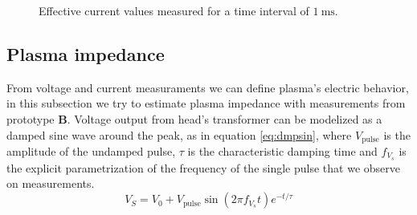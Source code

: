 \begin{figure}
 \centering
 \hfill
 \caption{Effective current values measured for a time interval of $\SI{1}{\milli\second}$.}
 \label{fig:ieff}
\end{figure}


\subsection{Plasma impedance}
From voltage and current measuraments we can define plasma's electric behavior, in this subsection we try to estimate plasma impedance with measurements from prototype \textbf{B}. Voltage output from head's transformer can be modelized as a damped sine wave around the peak, as in equation \ref{eq:dmpsin}, where $V_{\text{pulse}}$ is the amplitude of the undamped pulse, $\tau$ is the characteristic damping time and $f_{V_{s}}$ is the explicit parametrization of the frequency of the single pulse that we observe on measurements.
\begin{equation}
 V_{S} = V_{0} + V_{\text{pulse}} \sin{(2 \pi f_{V_{s}} t)} e^{-t/\tau}
 \label{eq:dmpsin}
\end{equation}

